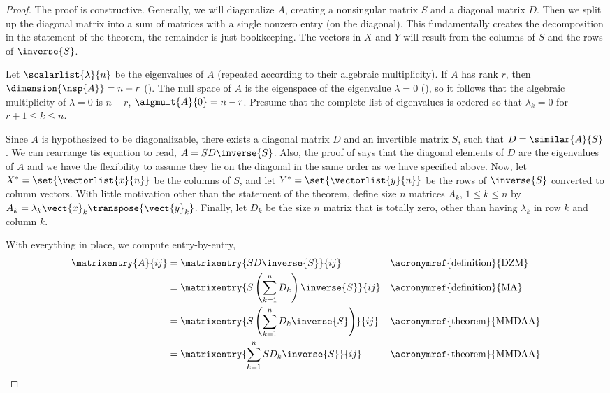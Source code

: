 \begin{proof}
The proof is constructive.  Generally, we will diagonalize $A$, creating a nonsingular matrix $S$ and a diagonal matrix $D$.  Then we split up the diagonal matrix into a sum of matrices with a single nonzero entry (on the diagonal).  This fundamentally creates the decomposition in the statement of the theorem, the remainder is just bookkeeping.  The vectors in $X$ and $Y$ will result from the columns of $S$ and the rows of $\inverse{S}$.\par
%
Let $\scalarlist{\lambda}{n}$ be the eigenvalues of $A$ (repeated according to their algebraic multiplicity).  If $A$ has rank $r$, then $\dimension{\nsp{A}}=n-r$ ().  The null space of $A$ is the eigenspace of the eigenvalue $\lambda=0$ (), so it follows that the algebraic multiplicity of $\lambda=0$ is $n-r$, $\algmult{A}{0}=n-r$.  Presume that the complete list of eigenvalues is ordered so that $\lambda_k=0$ for $r+1\leq k\leq n$.\par
%
Since $A$ is hypothesized to be diagonalizable, there exists a diagonal matrix $D$ and an invertible matrix $S$, such that $D=\similar{A}{S}$.  We can rearrange tis equation to read, $A=SD\inverse{S}$.  Also, the proof of  says that the diagonal elements of $D$ are the eigenvalues of $A$ and we have the flexibility to assume they lie on the diagonal in the same order as we have specified above.   Now, let $X^\ast=\set{\vectorlist{x}{n}}$ be the columns of $S$, and let $Y^\ast=\set{\vectorlist{y}{n}}$ be the rows of $\inverse{S}$ converted to column vectors.  With little motivation other than the statement of the theorem, define size $n$ matrices $A_k$, $1\leq k\leq n$ by $A_k=\lambda_k\vect{x}_k\transpose{\vect{y}_k}$.  Finally, let $D_k$ be the size $n$ matrix that is totally zero, other than having $\lambda_k$ in row $k$ and column $k$.\par
%
With everything in place, we compute entry-by-entry,
%
\begin{align*}
\matrixentry{A}{ij}
&=\matrixentry{SD\inverse{S}}{ij}
&&\text{\acronymref{definition}{DZM}}\\
%
&=\matrixentry{S\left(\sum_{k=1}^{n}D_k\right)\inverse{S}}{ij}&&\text{\acronymref{definition}{MA}}\\
%
&=\matrixentry{S\left(\sum_{k=1}^{n}D_k\inverse{S}\right)}{ij}&&\text{\acronymref{theorem}{MMDAA}}\\
%
&=\matrixentry{\sum_{k=1}^{n}SD_k\inverse{S}}{ij}
&&\text{\acronymref{theorem}{MMDAA}}\\

\end{align*}
\end{proof}
